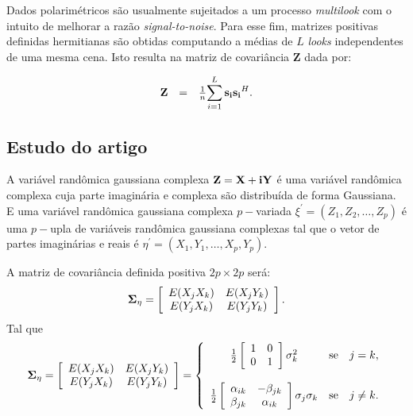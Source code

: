 \documentclass[10pt,a4paper]{article}
\begin{document}
Dados polarimétricos são usualmente sujeitados a um processo {\it multilook} com o intuito de melhorar a razão {\it signal-to-noise}. Para esse fim, matrizes positivas definidas hermitianas são obtidas computando a médias de $L$ {\it looks} independentes de uma mesma cena. Isto resulta na matriz de covariância {\bf Z} dada por:

\begin{equation}\label{sec1eqn3}
\begin{array}{ccc}
	{\bf Z}&=&\frac{1}{n}\displaystyle{\sum_{i=1}^{L} {\bf s_i}{\bf s_i}^H} . \\
\end{array}
\end{equation}

\subsection{Estudo do artigo  \cite{goodman1963}}


A variável randômica gaussiana complexa ${\bf Z=X+iY}$ é uma variável randômica complexa cuja parte imaginária e complexa são distribuída de forma Gaussiana.  E uma variável randômica gaussiana complexa $p-$variada $\xi^{'}=(Z_1,Z_2,\dots,Z_p)$ é uma $p-$upla  de variáveis randômica gaussiana complexas tal que o vetor de partes imaginárias e reais é $\eta^{'}=(X_1,Y_1,\dots,X_p,Y_p)$.

A matriz de covariância definida positiva $2p\times 2p$ será:
$$
{\bf \Sigma_{\eta}} = \left[
\begin{array}{cc}
	E(X_jX_k)  & E(X_jY_k)  \\
	E(Y_jX_k)  & E(Y_jY_k)  \\
\end{array}
\right].
$$
Tal que
$$
{\bf \Sigma_{\eta}} = \left[
\begin{array}{cc}
	E(X_jX_k)  & E(X_jY_k)  \\
	E(Y_jX_k)  & E(Y_jY_k)  \\
\end{array}
\right]= \left\{
\begin{array}{cc}
	\frac{1}{2}\left[
\begin{array}{cc}
	 1 & 0  \\
	 0 & 1  \\
\end{array}
	\right]\sigma^{2}_{k}  & \mbox{se}\quad j=k, \\
	& \\
	\frac{1}{2}\left[
\begin{array}{cc}
	\alpha_{ik} & -\beta_{jk}  \\
	 \beta_{jk} & \alpha_{ik}  \\
\end{array}
	\right]\sigma_j\sigma_k  & \mbox{se}\quad j\neq k.   \\
\end{array}
\right.
$$
\end{document}
